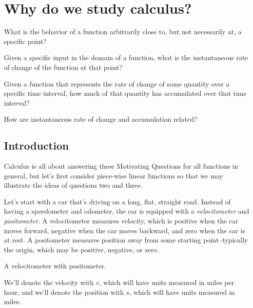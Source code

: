 \section{Why do we study calculus?} \label{S:0.1}

\begin{goals}
\item What is the behavior of a function arbitrarily close to, but not necessarily at, a specific point?
\item Given a specific input in the domain of a function, what is the instantaneous rate of change of the function at that point?
\item Given a function that represents the rate of change of some quantity over a specific time interval, how much of that quantity has accumulated over that time interval?
\item How are instantaneous rate of change and accumulation related?
\end{goals}

\subsection*{Introduction}

Calculus is all about answering these Motivating Questions for all functions in general, but let's first consider piece-wise linear functions so that we may illustrate the ideas of questions two and three.    

Let's start with a car that's driving on a long, flat, straight road.  Instead of having a speedometer and odometer, the car is equipped with a {\em velocitometer} and {\em positometer}.  A velocitometer measures velocity, which is positive when the car moves forward, negative when the car moves backward, and zero when the car is at rest.  A positometer measures position away from some starting point--typically the origin, which may be positive, negative, or zero.
\begin{marginfigure}[-2in] %
\begin{center}
{\scalebox{.5}{}}
\caption{A velocitometer with positometer.}
\label{fig:velocitometer}
\end{center}
\end{marginfigure}

We'll denote the velocity with $v$, which will have units measured in miles per hour, and we'll denote the position with $s$, which will have units measured in miles.

